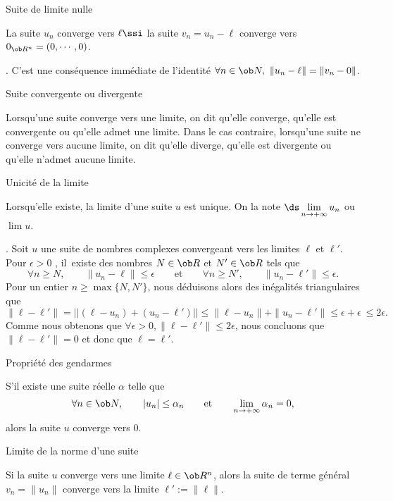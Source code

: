 %


\Concept [Index=Suites!limites!limite nulle] Suite de limite nulle

La suite $u_n$ converge vers $\ell\ssi$ la suite $v_n=u_n-\ell$ converge vers $0_{\ob R^n}=(0,\cdots, 0)$.

\Demonstration. C'est une conséquence immédiate de l'identité $\forall n\in\ob N, \ \|u_n-\ell\|=\|v_n-0\|$. \CQFD

%

\Concept [Index=Suites!convergente] Suite convergente ou divergente

\Definition 
Lorsqu'une suite converge vers une limite, on dit qu'elle converge, qu'elle est convergente ou qu'elle admet une limite. \pn
Dans le cas contraire, lorsqu'une suite ne converge vers aucune limite, on dit qu'elle diverge, qu'elle est divergente ou qu'elle 
n'admet aucune limite. 

\Concept [Index=Suites!limites!Unicite@Unicité]Unicité de la limite

\Propriete 
Lorsqu'elle existe, la limite d'une suite $u$ est unique. On la note $\ds\lim\limits_{n\to+\infty}u_n$ ou $\lim u$. 

\Demonstration. Soit $u$ une suite de nombres complexes convergeant vers les limites $\ell$ et $\ell'$.  Pour $\epsilon>0$ , il~existe des nombres $N\in\ob R$ et $N'\in\ob R$ tels que 
$$
\forall n\ge N, \qquad \|u_n-\ell\|\le \epsilon\qquad\mbox{et}\qquad 
\forall n\ge N', \qquad \|u_n-\ell'\|\le \epsilon. 
$$ 
Pour un entier $n\ge\max\{N,N'\}$, nous déduisons alors des inégalités triangulaires que 
$$
{\|\ell-\ell'\|}=\big|\big|(\ell-u_n)+(u_n-\ell')\big|\big|\le \|\ell-u_n\|+\|u_n-\ell'\|\le \epsilon+\epsilon\ {\le2\epsilon.}
$$ 
Comme nous obtenons que $\forall \epsilon>0, \|\ell-\ell'\|\le2\epsilon$, nous concluons que $\|\ell-\ell'\|=0$ et donc que 
$\ell=\ell'$. 
\CQFD


\Concept [Index=Suites!Propriété des gendarmes] Propriété des gendarmes

S'il existe une suite réelle $\alpha$ telle que 
$$
\forall n\in\ob N, \qquad |u_n|\le \alpha_n\qquad \mbox{et}\qquad \lim_{n\to+\infty}\alpha_n=0, 
$$
alors la suite $u$ converge vers $0$. 


\Concept [Index=Suites!limites!limite de $\|u\|$] Limite de la norme d'une suite

Si la suite $u$ converge vers une limite $\ell\in\ob R^n$, alors la suite de terme général $v_n=\|u_n\|$ converge vers la limite $\ell':=\|\ell\|$. 


